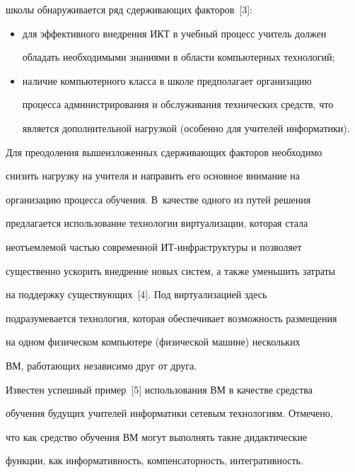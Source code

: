 школы обнаруживается ряд сдерживающих факторов~[3]:


\begin{itemize}


\item  для эффективного внедрения ИКТ в учебный процесс учитель должен 


обладать необходимыми знаниями в области компьютерных технологий;


\item  наличие компьютерного класса в школе предполагает организацию 


процесса администрирования и обслуживания технических средств, что 


является дополнительной нагрузкой (особенно для учителей информатики).


\end{itemize}





Для преодоления вышеизложенных сдерживающих факторов необходимо 


снизить нагрузку на учителя и направить его основное внимание на 


организацию процесса обучения. В~качестве одного из путей решения 


предлагается использование технологии виртуализации, которая стала 


неотъемлемой частью современной ИТ-ин\-фра\-струк\-ту\-ры и позволяет 


существенно ускорить внедрение новых сис\-тем, а также уменьшить затраты 


на поддержку существующих~[4]. Под виртуализацией здесь 


подразумевается технология, которая обеспечивает возможность размещения 


на одном физическом компьютере (физической машине) нескольких 


ВМ, работающих независимо друг от друга.





Известен успешный пример~[5] использования ВМ в качестве средства 


обуче\-ния будущих учителей информатики сетевым технологиям. Отмечено, 


что как средство обучения ВМ могут выполнять такие дидактические 


функции, как информативность, компенсаторность, интегративность.





